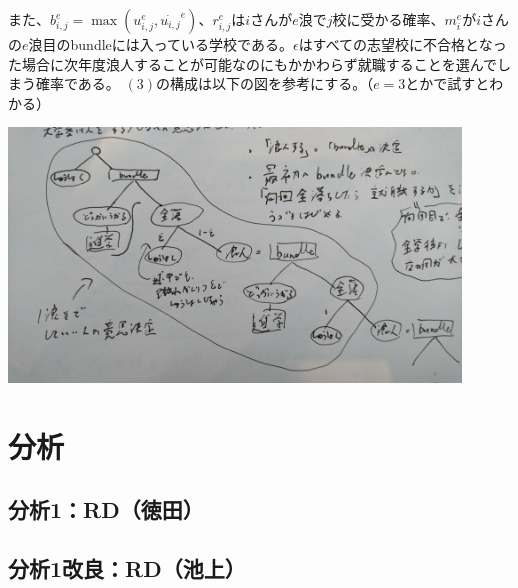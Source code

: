 \documentclass{jsarticle}
\begin{document}
	また、$b_{i, j}^e = \max(u_{i, j}^e, \dot{u_{i, j}}^e)$、$r_{i, j}^e$は$i$さんが$e$浪で$j$校に受かる確率、$m_i^e$が$i$さんの$e$浪目のbundleには入っている学校である。$\epsilon$はすべての志望校に不合格となった場合に次年度浪人することが可能なのにもかかわらず就職することを選んでしまう確率である。
	$(3)$の構成は以下の図を参考にする。（$e = 3$とかで試すとわかる）
	\begin{center}
	\includegraphics[width = 12cm]{fig1.png}
	\end{center}
	
	\section{分析}
	\subsection{分析1：RD（徳田）}
	
	\subsection{分析1改良：RD（池上）}
	
\end{document}
